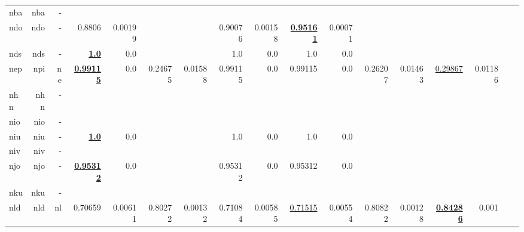 \documentclass[11pt]{article}
\begin{document}
\begin{table*}[h]
{\begin{tabular}{lrrrrrrrrrrrrrrrr}
nba         & nba         & -         &          &          &          &          &          &          &          &          &          &          &          &          \\
ndo         & ndo         & -         & 0.8806         & 0.00199         &          &          & 0.90076         & 0.00158         & \textbf{\underline{0.95161}}         & 0.00071         &          &          &          &          \\
nds         & nds         & -         & \textbf{\underline{1.0}}         & 0.0         &          &          & 1.0         & 0.0         & 1.0         & 0.0         &          &          &          &          \\
nep         & npi         & ne         & \textbf{\underline{0.99115}}         & 0.0         & 0.24675         & 0.01588         & 0.99115         & 0.0         & 0.99115         & 0.0         & 0.26207         & 0.01463         & \underline{0.29867}         & 0.01186         \\
nhn         & nhn         & -         &          &          &          &          &          &          &          &          &          &          &          &          \\
nio         & nio         & -         &          &          &          &          &          &          &          &          &          &          &          &          \\
niu         & niu         & -         & \textbf{\underline{1.0}}         & 0.0         &          &          & 1.0         & 0.0         & 1.0         & 0.0         &          &          &          &          \\
niv         & niv         & -         &          &          &          &          &          &          &          &          &          &          &          &          \\
njo         & njo         & -         & \textbf{\underline{0.95312}}         & 0.0         &          &          & 0.95312         & 0.0         & 0.95312         & 0.0         &          &          &          &          \\
nku         & nku         & -         &          &          &          &          &          &          &          &          &          &          &          &          \\
nld         & nld         & nl         & 0.70659         & 0.00611         & 0.80272         & 0.00132         & 0.71084         & 0.00585         & \underline{0.71515}         & 0.00554         & 0.80822         & 0.00128         & \textbf{\underline{0.84286}}         & 0.001         \\

\end{tabular}}
\end{table*}
\end{document}
